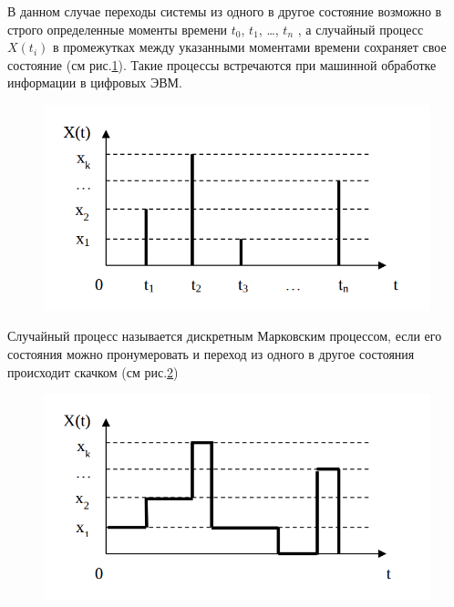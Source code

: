 \documentclass[12pt]{article}
\begin{document}
В данном случае переходы системы из одного в другое состояние возможно в строго определенные моменты времени ${t_0}$, ${t_1}$, …, ${t_n}$ , а случайный
процесс $X(t_i)$ в промежутках между указанными моментами времени сохраняет свое состояние (см рис.\ref{figure1}). Такие процессы встречаются при машинной обработке информации в цифровых ЭВМ. 

\begin{figure}[!ht]
\begin{center}
\includegraphics[scale=0.5]{1_pic.png}\caption{}\label{figure1}
\end{center}
\end{figure}

Случайный процесс называется дискретным Марковским процессом, если его состояния можно пронумеровать и переход из одного в другое состояния происходит скачком (см рис.\ref{figure2})

\begin{figure}[!ht]
\begin{center}
\includegraphics[scale=0.5]{2_pic.png}\caption{}\label{figure2}
\end{center}
\end{figure}
\end{document}
